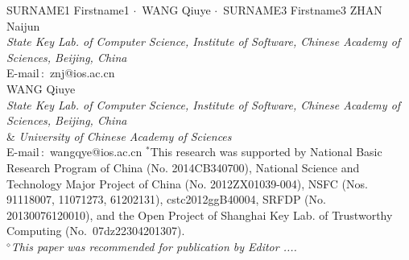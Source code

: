 \documentclass{jssc}
\def\cdd{\mbox{\boldmath$\cdot$}~}
\begin{document}
{\uppercase{Surname1} Firstname1 \cdd \uppercase{WANG}
Qiuye \cdd \uppercase{Surname3} Firstname3}%
{ZHAN Naijun\\
{\it State Key Lab. of Computer Science, Institute of Software, Chinese Academy of Sciences, Beijing, China}\\
E-mail\,$:$ znj@ios.ac.cn\\
WANG Qiuye \\
{\it State Key Lab. of Computer Science, Institute of Software, Chinese Academy of Sciences, Beijing, China}\\
\& {\it University of Chinese Academy of Sciences}\\
E-mail\,$:$ wangqye@ios.ac.cn}
{$^*$This research was supported by National Basic Research Program of China (No. 2014CB340700), National Science and Technology Major Project of China (No. 2012ZX01039-004), NSFC (Nos. 91118007, 11071273, 61202131), cstc2012ggB40004, SRFDP (No. 20130076120010), and the Open Project of Shanghai Key Lab. of Trustworthy Computing (No.~07dz22304201307).\\
{$^\diamond${\it This paper was recommended for publication by
Editor .... }}}

\end{document}
